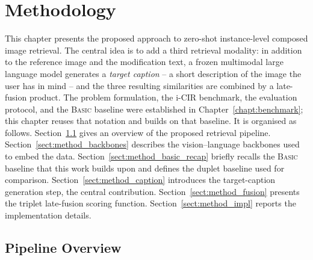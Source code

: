 

\chapter{Methodology}\label{chapt:method}

This chapter presents the proposed approach to zero-shot instance-level
composed image retrieval. The central idea is to add a third retrieval
modality: in addition to the reference image and the modification text, a frozen
multimodal large language model generates a \emph{target caption} -- a short
description of the image the user has in mind -- and the three resulting
similarities are combined by a late-fusion product. The problem
formulation, the i-CIR benchmark, the evaluation protocol, and the
\textsc{Basic} baseline were established in Chapter~\ref{chapt:benchmark}; this
chapter reuses that notation and builds on that baseline. It is organised as
follows.
Section~\ref{sect:method_overview} gives an overview of the proposed retrieval
pipeline.
Section~\ref{sect:method_backbones} describes the vision--language backbones
used to embed the data.
Section~\ref{sect:method_basic_recap} briefly recalls the \textsc{Basic}
baseline that this work builds upon and defines the duplet baseline used for
comparison.
Section~\ref{sect:method_caption} introduces the target-caption generation
step, the central contribution.
Section~\ref{sect:method_fusion} presents the triplet late-fusion scoring
function.
Section~\ref{sect:method_impl} reports the implementation details.

\section{Pipeline Overview}\label{sect:method_overview}

